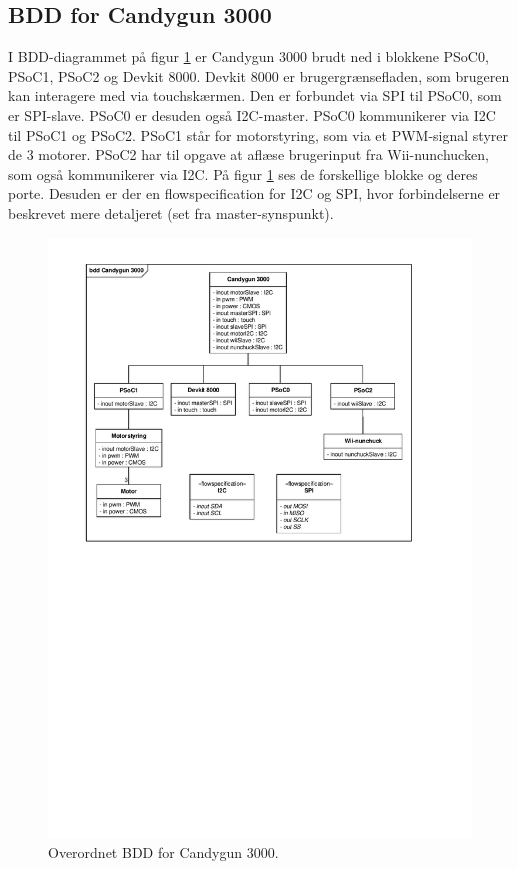\subsection{BDD for Candygun 3000}
I BDD-diagrammet på figur \ref{fig:BDD} er Candygun 3000 brudt ned i blokkene PSoC0, PSoC1, PSoC2 og Devkit 8000. Devkit 8000 er brugergrænsefladen, som brugeren kan interagere med via touchskærmen. Den er forbundet via SPI til PSoC0, som er SPI-slave. PSoC0 er desuden også I2C-master. PSoC0 kommunikerer via I2C til PSoC1 og PSoC2. PSoC1 står for motorstyring, som via et PWM-signal styrer de 3 motorer. PSoC2 har til opgave at aflæse brugerinput fra Wii-nunchucken, som også kommunikerer via I2C. På figur \ref{fig:BDD} ses de forskellige blokke og deres porte. Desuden er der en flowspecification for I2C og SPI, hvor forbindelserne er beskrevet mere detaljeret (set fra master-synspunkt). 

\begin{figure}[H]
	\centering
	\includegraphics[trim = {1.8cm 14.6cm 1.8cm 1cm}, clip = true, width = \textwidth]{Systemarkitektur/images/BDD_overordnet.pdf}
	\caption{Overordnet BDD for Candygun 3000.}
	\label{fig:BDD}
\end{figure}

